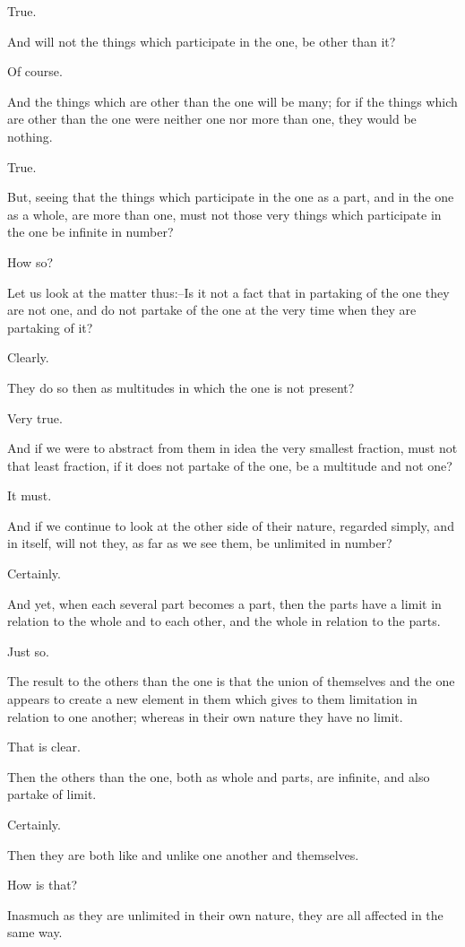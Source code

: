 True.

And will not the things which participate in the one, be other than it?

Of course.

And the things which are other than the one will be many; for if the
things which are other than the one were neither one nor more than one,
they would be nothing.

True.

But, seeing that the things which participate in the one as a part, and
in the one as a whole, are more than one, must not those very things
which participate in the one be infinite in number?

How so?

Let us look at the matter thus:--Is it not a fact that in partaking of
the one they are not one, and do not partake of the one at the very time
when they are partaking of it?

Clearly.

They do so then as multitudes in which the one is not present?

Very true.

And if we were to abstract from them in idea the very smallest fraction,
must not that least fraction, if it does not partake of the one, be a
multitude and not one?

It must.

And if we continue to look at the other side of their nature, regarded
simply, and in itself, will not they, as far as we see them, be
unlimited in number?

Certainly.

And yet, when each several part becomes a part, then the parts have
a limit in relation to the whole and to each other, and the whole in
relation to the parts.

Just so.

The result to the others than the one is that the union of themselves
and the one appears to create a new element in them which gives to them
limitation in relation to one another; whereas in their own nature they
have no limit.

That is clear.

Then the others than the one, both as whole and parts, are infinite, and
also partake of limit.

Certainly.

Then they are both like and unlike one another and themselves.

How is that?

Inasmuch as they are unlimited in their own nature, they are all
affected in the same way.

